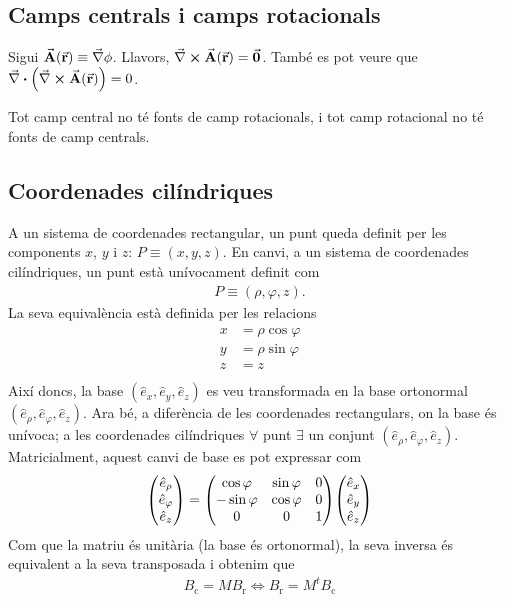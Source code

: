 \subsection{Camps centrals i camps rotacionals}
Sigui $\va{A}(\va{r}) \equiv \vec{\nabla} \phi$. Llavors, $\rot{A}(\va{r}) = \va{0}$. També es pot veure que $\vnabla \vdot \qty(\rot{A}(\va{r})) = 0$.
\begin{cor}
	Tot camp central no té fonts de camp rotacionals, i tot camp rotacional no té fonts de camp centrals.
\end{cor}

\subsection{Coordenades cilíndriques}
A un sistema de coordenades rectangular, un punt queda definit per les components $x$, $y$ i $z$: $P \equiv (x,y,z)$. En canvi, a un sistema de coordenades cilíndriques, un punt està unívocament definit com
\begin{align}
	P \equiv (\rho, \varphi, z).
\end{align}
La seva equivalència està definida per les relacions
\begin{align}
	\begin{aligned}
		x & = \rho \cos \varphi \\
		y & = \rho \sin \varphi \\
		z & = z \\
	\end{aligned}
\end{align}
Així doncs, la base $(\hat{e}_{x}, \hat{e}_{y}, \hat{e}_{z})$ es veu transformada en la base ortonormal $(\hat{e}_{\rho}, \hat{e}_{\varphi}, \hat{e}_{z})$. Ara bé, a diferència de les coordenades rectangulars, on la base és unívoca; a les coordenades cilíndriques $\forall$ punt $\exists$ un conjunt $(\hat{e}_{\rho}, \hat{e}_{\varphi}, \hat{e}_{z})$. Matricialment, aquest canvi de base es pot expressar com
\begin{align}
	\mqty( \hat{e}_{\rho} \\ \hat{e}_{\varphi} \\ \hat{e}_{z} ) = \mqty( \cos \varphi & \sin \varphi & 0 \\ -\sin \varphi & \cos \varphi & 0 \\ 0 & 0 & 1 ) \mqty( \hat{e}_{x} \\ \hat{e}_{y} \\ \hat{e}_{z} )
\end{align}
Com que la matriu és unitària (la base és ortonormal), la seva inversa és equivalent a la seva transposada i obtenim que
\begin{align*}
	B_{\text{c}} = M B_{\text{r}} \Leftrightarrow B_{\text{r}} = M^{t} B_{\text{c}}
\end{align*}

